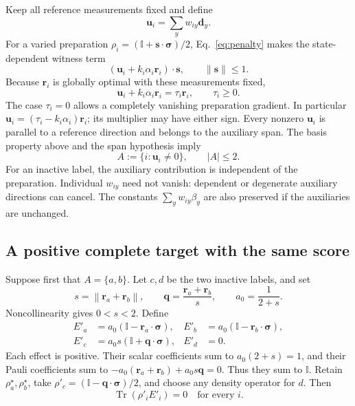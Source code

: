 \documentclass[11pt,a4paper]{article}
\newcommand{\id}{\mathbb{I}}
\newcommand{\tr}{\operatorname{Tr}}
\newcommand{\bs}{\boldsymbol{\sigma}}
\newcommand{\rv}{\mathbf{r}}
\newcommand{\dv}{\mathbf{d}}
\newcommand{\uv}{\mathbf{u}}
\newcommand{\qv}{\mathbf{q}}
\newcommand{\norm}[1]{\left\lVert#1\right\rVert}
\begin{document}
Keep all reference measurements fixed and define
\begin{equation}
 \uv_i=\sum_yw_{iy}\dv_y.
 \label{eq:u}
\end{equation}
For a varied preparation $\rho_i=(\id+\mathbf{s}\cdot\bs)/2$,
Eq.~\eqref{eq:penalty} makes the state-dependent witness term
\begin{equation}
 (\uv_i+k_i\alpha_i\rv_i)\cdot\mathbf{s},
 \qquad \norm{\mathbf{s}}\leq1.
 \label{eq:gradient}
\end{equation}
Because $\rv_i$ is globally optimal with these measurements fixed,
\begin{equation}
 \uv_i+k_i\alpha_i\rv_i=\tau_i\rv_i,
 \qquad \tau_i\geq0.
 \label{eq:alignment}
\end{equation}
The case $\tau_i=0$ allows a completely vanishing preparation gradient.
In particular $\uv_i=(\tau_i-k_i\alpha_i)\rv_i$; its multiplier may have
either sign. Every nonzero $\uv_i$ is parallel to a reference direction
and belongs to the auxiliary span. The basis property above and the span
hypothesis imply
\begin{equation}
 A:=\{i:\uv_i\ne0\},\qquad |A|\leq2.
 \label{eq:active}
\end{equation}
For an inactive label, the auxiliary contribution is independent of the
preparation. Individual $w_{iy}$ need not vanish: dependent or degenerate
auxiliary directions can cancel. The constants $\sum_yw_{iy}\beta_y$
are also preserved if the auxiliaries are unchanged.

\subsection{A positive complete target with the same score}

Suppose first that $A=\{a,b\}$. Let $c,d$ be the two inactive labels, and set
\begin{equation}
 s=\norm{\rv_a+\rv_b},\qquad
 \qv=\frac{\rv_a+\rv_b}{s},\qquad a_0=\frac{1}{2+s}.
 \label{eq:q}
\end{equation}
Noncollinearity gives $0<s<2$. Define
\begin{equation}
 \begin{aligned}
 E'_a&=a_0(\id-\rv_a\cdot\bs),&
 E'_b&=a_0(\id-\rv_b\cdot\bs),\\
 E'_c&=a_0s(\id+\qv\cdot\bs),& E'_d&=0.
 \end{aligned}
 \label{eq:replacement}
\end{equation}
Each effect is positive. Their scalar coefficients sum to $a_0(2+s)=1$,
and their Pauli coefficients sum to
$-a_0(\rv_a+\rv_b)+a_0s\qv=0$. Thus they sum to $\id$.
Retain $\rho_a^\star,\rho_b^\star$, take
$\rho'_c=(\id-\qv\cdot\bs)/2$, and choose any density operator for $d$.
Then
\begin{equation}
 \tr(\rho'_iE'_i)=0\quad\text{for every }i.
 \label{eq:newzeros}
\end{equation}
\end{document}
